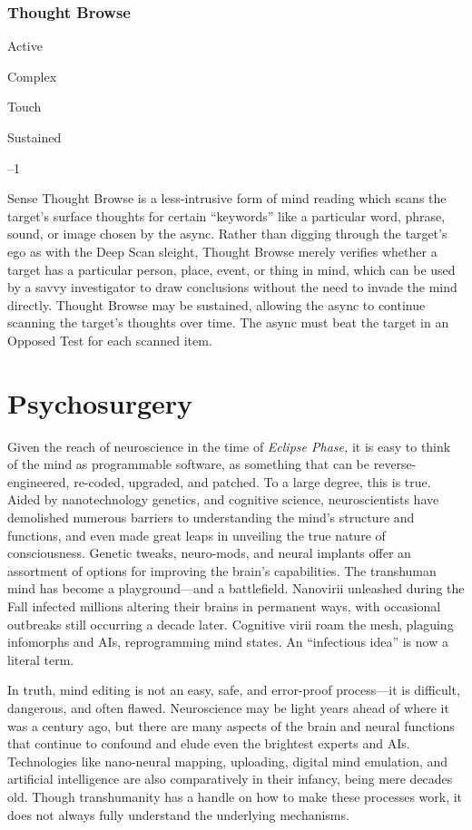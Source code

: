 \subsubsection{Thought Browse}


  

Active

   Complex

 Touch

   Sustained

   –1

  

Sense
Thought Browse is a less-intrusive form of mind 
reading which scans the target's surface thoughts for 
certain ``keywords'' like a particular word, phrase, 
sound, or image chosen by the async. Rather than digging
through the target's ego as with the Deep Scan
sleight, Thought Browse merely verifies whether a 
target has a particular person, place, event, or thing 
in mind, which can be used by a savvy investigator to 
draw conclusions without the need to invade the mind 
directly. Thought Browse may be sustained, allowing 
the async to continue scanning the target's thoughts 
over time. The async must beat the target in an Opposed
Test for each scanned item.

\section{Psychosurgery}

Given the reach of neuroscience in the time of 
\textit{Eclipse Phase,} it is easy to think of the mind as 
programmable software, as something that can be 
reverse-engineered, re-coded, upgraded, and patched. 
To a large degree, this is true. Aided by nanotechnology
genetics, and cognitive science, neuroscientists
have demolished numerous barriers to understanding
the mind's structure and functions, and even
made great leaps in unveiling the true nature of 
consciousness. Genetic tweaks, neuro-mods, and 
neural implants offer an assortment of options for 
improving the brain's capabilities. The transhuman 
mind has become a playground—and a battlefield. 
Nanovirii unleashed during the Fall infected millions
altering their brains in permanent ways, with
occasional outbreaks still occurring a decade later. 
Cognitive virii roam the mesh, plaguing infomorphs 
and AIs, reprogramming mind states. An ``infectious 
idea'' is now a literal term.

In truth, mind editing is not an easy, safe, and 
error-proof process—it is difficult, dangerous, and 
often flawed. Neuroscience may be light years 
ahead of where it was a century ago, but there are 
many aspects of the brain and neural functions 
that continue to confound and elude even the 
brightest experts and AIs. Technologies like nano-neural
mapping, uploading, digital mind emulation,
and artificial intelligence are also comparatively 
in their infancy, being mere decades old. Though 
transhumanity has a handle on how to make these 
processes work, it does not always fully understand 
the underlying mechanisms.

